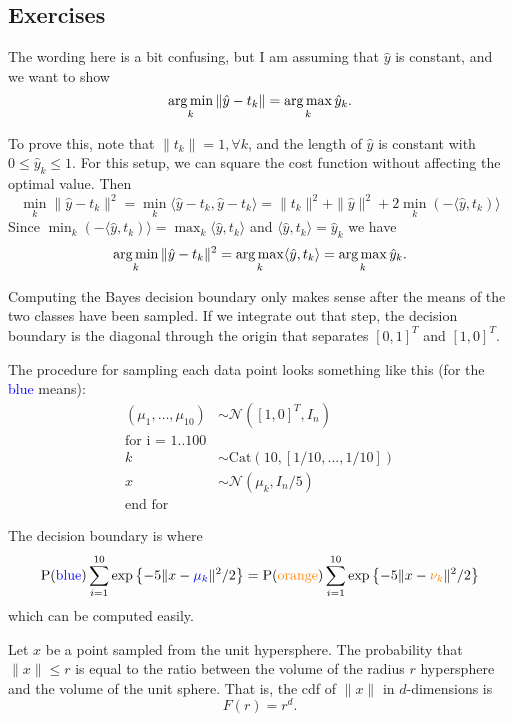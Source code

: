 \subsection{Exercises}

The wording here is a bit confusing, but I am assuming that $\hat{y}$ is constant, and we want to show 
$$
\operatorname*{arg\,min}_k \|\hat{y} - t_k\| = \operatorname*{arg\,max}_k \hat{y}_k.
$$

To prove this, note that $\|t_k\| = 1, \forall k$, and the length of $\hat{y}$ is constant with $0 \leq \hat{y}_k \leq 1$. For this setup, we can square the cost function without affecting the optimal value. Then
$$
\min_k \|\hat{y} - t_k\|^2 = \min_k \langle \hat{y} - t_k, \hat{y} - t_k \rangle = \|t_k\|^2 + \|\hat{y}\|^2 + 2\min_k (-\langle \hat{y}, t_k) \rangle
$$
Since $\min_k (-\langle \hat{y}, t_k)\rangle = \max_k \langle \hat{y}, t_k\rangle$ and $\langle \hat{y}, t_k\rangle = \hat{y}_k$ we have
$$
\operatorname*{arg\,min}_k \|\hat{y} - t_k\|^2 =\operatorname*{arg\,max}_k \langle \hat{y}, t_k \rangle = \operatorname*{arg\,max}_k \hat{y}_k.
$$

Computing the Bayes decision boundary only makes sense after the means of the two classes have been sampled. If we integrate out that step, the decision boundary is the diagonal through the origin that separates $[0, 1]^T$ and $[1, 0]^T$.

The procedure for sampling each data point looks something like this (for the \textcolor{blue}{blue} means):
\begin{align*}
(\mu_1, \ldots, \mu_{10}) &\sim \mathcal{N}([1, 0]^T, I_n)\\
\text{for i = 1..100}\\
k &\sim \mathrm{Cat}(10, [1/10, \ldots, 1/10])\\
x &\sim \mathcal{N}(\mu_k, I_n / 5)\\
\text{end for}
\end{align*}

The decision boundary is where
$$
\mathrm{P}(\textcolor{blue}{\mathrm{blue}}) \sum_{i = 1}^{10} \exp\left\{-5\|x - \textcolor{blue}{\mu_k}\|^2 / 2\right\} = \mathrm{P}(\textcolor{orange}{\mathrm{orange}}) \sum_{i = 1}^{10} \exp\left\{-5\|x - \textcolor{orange}{\nu_k}\|^2 / 2\right\} 
$$
which can be computed easily.

Let $x$ be a point sampled from the unit hypersphere. The probability that $\|x\| \leq r$ is equal to the ratio between the volume of the radius $r$ hypersphere and the volume of the unit sphere. That is, the cdf of $\|x\|$ in $d$-dimensions is
$$
F(r) = r^d.
$$

